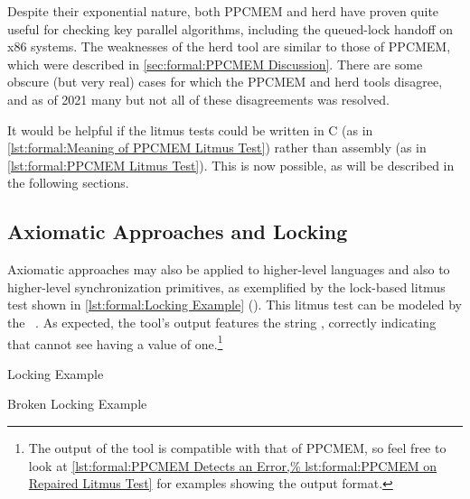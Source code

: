 Despite their exponential nature, both PPCMEM and herd have proven quite
useful for checking key parallel algorithms, including the queued-lock
handoff on x86 systems.
The weaknesses of the herd tool are similar to those of PPCMEM, which
were described in
\cref{sec:formal:PPCMEM Discussion}.
There are some obscure (but very real) cases for which the PPCMEM and
herd tools disagree, and as of 2021 many but not all of these disagreements
was resolved.

It would be helpful if the litmus tests could be written in C
(as in \cref{lst:formal:Meaning of PPCMEM Litmus Test})
rather than assembly
(as in \cref{lst:formal:PPCMEM Litmus Test}).
This is now possible, as will be described in the following sections.

\subsection{Axiomatic Approaches and Locking}
\label{sec:formal:Axiomatic Approaches and Locking}

Axiomatic approaches may also be applied to higher-level
languages and also to higher-level synchronization primitives, as
exemplified by the lock-based litmus test shown in
\cref{lst:formal:Locking Example} ().
This litmus test can be modeled by the
~\cite{Alglave:2018:FSC:3173162.3177156,LucMaranget2018lock.cat}.
As expected, the  tool's output features the string ,
correctly indicating that  cannot see  having a value
of one.\footnote{
	The output of the  tool is compatible with that
	of PPCMEM, so feel free to look at
	\cref{lst:formal:PPCMEM Detects an Error,%
	lst:formal:PPCMEM on Repaired Litmus Test}
	for examples showing the output format.}

\begin{listing}

\caption{Locking Example}
\label{lst:formal:Locking Example}
\end{listing}

\QuickQuizEnd

\begin{listing}

\caption{Broken Locking Example}
\label{lst:formal:Broken Locking Example}
\end{listing}

